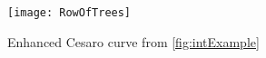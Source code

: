 \begin{figure}[h]
	\texttt{[image: RowOfTrees]}
	\caption{Enhanced Cesaro curve from \autoref{fig:intExample} \cite[p.~48]{PL91}}
	\label{fig:rowOfTrees}
\end{figure}


































